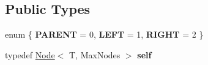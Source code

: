 \subsection*{Public Types}
\begin{DoxyCompactItemize}
\item 
\mbox{\label{classez_1_1objects_1_1Node_a73eb39480a3572832b9d852cf127eb72}} 
enum \{ {\bfseries P\+A\+R\+E\+NT} = 0, 
{\bfseries L\+E\+FT} = 1, 
{\bfseries R\+I\+G\+HT} = 2
 \}
\item 
\mbox{\label{classez_1_1objects_1_1Node_a36ce2c35f03e113ed433bfb230f8cbab}} 
typedef \hyperlink{classez_1_1objects_1_1Node}{Node}$<$ T, Max\+Nodes $>$ {\bfseries self}
\end{DoxyCompactItemize}
